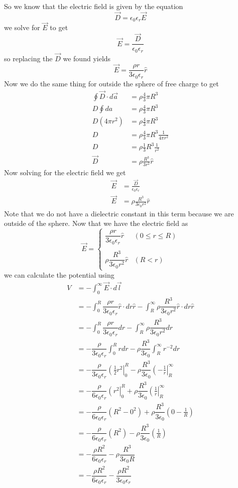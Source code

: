 \documentclass[11pt]{article}
\numberwithin{equation}{section}
\newcommand{\vecE}{\vec{E}}
\begin{document}
So we know that the electric field is given by the equation
$$\vec{D} = \epsilon_0\epsilon_r\vecE$$
we solve for $\vecE$ to get
$$\vecE=\frac{\vec{D}}{\epsilon_0\epsilon_r}$$
so replacing the $\vec{D}$ we found yields
$$\vecE=\frac{\rho r}{3\epsilon_0\epsilon_r}\hat{r}$$
Now we do the same thing for outside the sphere of free charge to get
\begin{align*}
\oint\vec{D}\cdot d\vec{a} &= \rho\frac{4}{3}\pi R^3\\
D\oint da &= \rho\frac{4}{3}\pi R^3\\
D(4\pi r^2) &= \rho\frac{4}{3}\pi R^3\\
D &= \rho\frac{4}{3}\pi R^3\frac{1}{4\pi r^2}\\
D &= \rho\frac{1}{3}R^3\frac{1}{r^2}\\
\vec{D} &= \rho\frac{R^3}{3r^2}\hat{r}
\end{align*}
Now solving for the electric field we get
\begin{align*}
\vecE &=\frac{\vec{D}}{\epsilon_0\epsilon_r}\\
\vecE &= \rho\frac{R^3}{3\epsilon_0r^2}\hat{r}
\end{align*}
Note that we do not have a dielectric constant in this term because we are outside of the sphere. Now that we have the electric field as 
$$\vecE = \left\{\begin{array}{lc}
	\dfrac{\rho r}{3\epsilon_0\epsilon_r}\hat{r}	&(0\le r\le R) \\
\\
	\rho\dfrac{R^3}{3\epsilon_0r^2}\hat{r}	&(R<r)
		\end{array}\right.$$
we can calculate the potential using
\begin{align*}
V &= -\int_0^{\infty} \vecE\cdot d\vec{l}\\
&= -\int_0^{R} \dfrac{\rho r}{3\epsilon_0\epsilon_r}\hat{r}\cdot dr\hat{r} -\int_R^{\infty} \rho\dfrac{R^3}{3\epsilon_0r^2}\hat{r}\cdot dr\hat{r}\\
&= -\int_0^{R} \dfrac{\rho r}{3\epsilon_0\epsilon_r}dr -\int_R^{\infty} \rho\dfrac{R^3}{3\epsilon_0r^2}dr\\
&= -\dfrac{\rho}{3\epsilon_0\epsilon_r}\int_0^{R}rdr -\rho\dfrac{R^3}{3\epsilon_0}\int_R^{\infty} r^{-2}dr\\
&= -\dfrac{\rho}{3\epsilon_0\epsilon_r}\left(\frac{1}{2}r^2\right|_0^{R} -\rho\dfrac{R^3}{3\epsilon_0}\left(-\frac{1}{r}\right|_R^{\infty}\\
&= -\dfrac{\rho}{6\epsilon_0\epsilon_r}\left(r^2\right|_0^{R} +\rho\dfrac{R^3}{3\epsilon_0}\left(\frac{1}{r}\right|_R^{\infty}\\
&= -\dfrac{\rho}{6\epsilon_0\epsilon_r}\left(R^2-0^2\right) +\rho\dfrac{R^3}{3\epsilon_0}\left(0-\frac{1}{R}\right)\\
&= -\dfrac{\rho}{6\epsilon_0\epsilon_r}\left(R^2\right) -\rho\dfrac{R^3}{3\epsilon_0}\left(\frac{1}{R}\right)\\
&= -\dfrac{\rho R^2}{6\epsilon_0\epsilon_r} -\rho\dfrac{R^3}{3\epsilon_0R}\\
&= -\dfrac{\rho R^2}{6\epsilon_0\epsilon_r} -\dfrac{\rho R^2}{3\epsilon_0\epsilon_r}
\end{align*}
\end{document}
